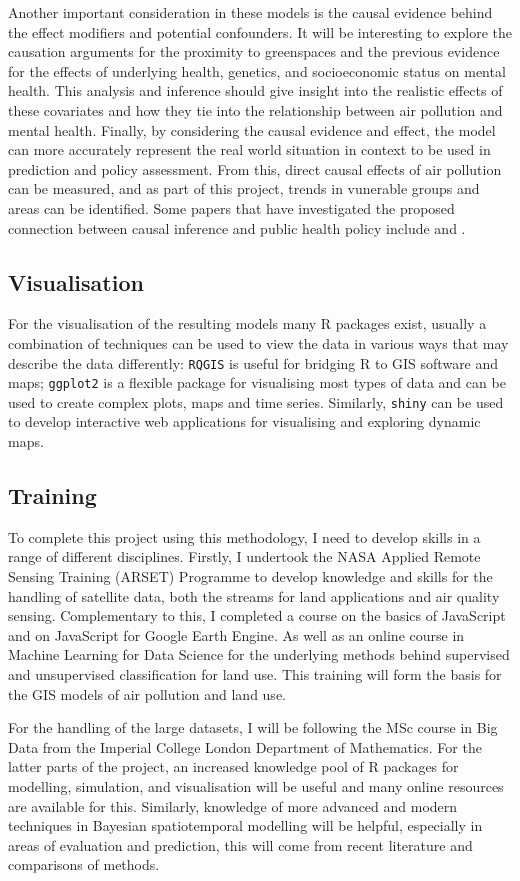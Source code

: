 Another important consideration in these models is the causal evidence behind the effect modifiers and potential confounders. It will be interesting to explore the causation arguments for the proximity to greenspaces and the previous evidence for the effects of underlying health, genetics, and socioeconomic status on mental health. This analysis and inference should give insight into the realistic effects of these covariates and how they tie into the relationship between air pollution and mental health. Finally, by considering the causal evidence and effect, the model can more accurately represent the real world situation in context to be used in prediction and policy assessment. From this, direct causal effects of air pollution can be measured, and as part of this project,  trends in vunerable groups and areas can be identified. Some papers that have investigated the proposed connection between causal inference and public health policy include \cite{Glass2013CausalHealth} and \cite{Pan2016HealthIntervention}.

\subsection{Visualisation}
For the visualisation of the resulting models many R packages exist, usually a combination of techniques can be used to view the data in various ways that may describe the data differently: \texttt{RQGIS} is useful for bridging R to GIS software and maps; \texttt{ggplot2} is a flexible package for visualising most types of data and can be used to create complex plots, maps and time series. Similarly, \texttt{shiny} can be used to develop interactive web applications for visualising and exploring dynamic maps.

\subsection{Training}

To complete this project using this methodology, I need to develop skills in a range of different disciplines. Firstly, I undertook the NASA Applied Remote Sensing Training (ARSET) Programme to develop knowledge and skills for the handling of satellite data, both the streams for land applications and air quality sensing. Complementary to this, I completed a course on the basics of JavaScript and on JavaScript for Google Earth Engine. As well as an online course in Machine Learning for Data Science for the underlying methods behind supervised and unsupervised classification for land use. This training will form the basis for the GIS models of air pollution and land use.

For the handling of the large datasets, I will be following the MSc course in Big Data from the Imperial College London Department of Mathematics. For the latter parts of the project, an increased knowledge pool of R packages for modelling, simulation, and visualisation will be useful and many online resources are available for this. Similarly, knowledge of more advanced and modern techniques in Bayesian spatiotemporal modelling will be helpful, especially in areas of evaluation and prediction, this will come from recent literature and comparisons of methods.